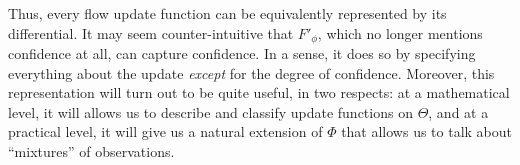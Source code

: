 Thus, every flow update function can be equivalently represented
by its differential.
% 
% 
It may seem counter-intuitive that $F'_\phi$,
which no longer mentions confidence at all,
can capture confidence. In a sense, it does so by specifying 
everything about the update \emph{except} for the degree of confidence.
Moreover, this representation will turn out to be quite useful, 
in two respects: at a mathematical level, it will allows us to
describe and classify update functions on $\Theta$, 
and at a practical level, it will give us a natural extension of $\Phi$
that allows us to talk about ``mixtures'' of observations. 

